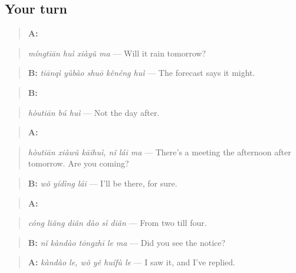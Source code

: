 \subsection*{Your turn}
\begin{quote}
\textbf{A:} 
\end{quote}

\begin{quote}
\emph{míngtiān huì xiàyǔ ma} — Will it rain tomorrow?
\end{quote}

\begin{quote}
\textbf{B:} \emph{tiānqì yùbào shuō kěnéng huì} — The forecast says it might.
\end{quote}

\begin{quote}
\textbf{B:} 
\end{quote}

\begin{quote}
\emph{hòutiān bú huì} — Not the day after.
\end{quote}

\begin{quote}
\textbf{A:}  
\end{quote}

\begin{quote}
\emph{hòutiān xiàwǔ kāihuì, nǐ lái ma} — There's a meeting the afternoon after tomorrow. Are you coming?
\end{quote}

\begin{quote}
\textbf{B:} \emph{wǒ yídìng lái} — I'll be there, for sure.
\end{quote}

\begin{quote}
\textbf{A:} 
\end{quote}

\begin{quote}
\emph{cóng liǎng diǎn dào sì diǎn} — From two till four.
\end{quote}

\begin{quote}
\textbf{B:} \emph{nǐ kàndào tōngzhī le ma} — Did you see the notice?
\end{quote}

\begin{quote}
\textbf{A:} \emph{kàndào le, wǒ yě huífù le} — I saw it, and I've replied.
\end{quote}

